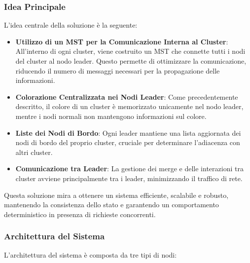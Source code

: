 \documentclass[12pt, a4paper]{report}
\begin{document}
\subsubsection{Idea Principale}

L'idea centrale della soluzione è la seguente:

\begin{itemize}
    \item \textbf{Utilizzo di un MST per la Comunicazione Interna al Cluster}: All'interno di ogni cluster, viene costruito un MST che connette tutti i nodi del cluster al nodo leader. Questo permette di ottimizzare la comunicazione, riducendo il numero di messaggi necessari per la propagazione delle informazioni.
    \item \textbf{Colorazione Centralizzata nei Nodi Leader}: Come precedentemente descritto, il colore di un cluster è memorizzato unicamente nel nodo leader, mentre i nodi normali non mantengono informazioni sul colore.
    \item \textbf{Liste dei Nodi di Bordo}: Ogni leader mantiene una lista aggiornata dei nodi di bordo del proprio cluster, cruciale per determinare l'adiacenza con altri cluster.
    \item \textbf{Comunicazione tra Leader}: La gestione dei merge e delle interazioni tra cluster avviene principalmente tra i leader, minimizzando il traffico di rete.
\end{itemize}

Questa soluzione mira a ottenere un sistema efficiente, scalabile e robusto, mantenendo la consistenza dello stato e garantendo un comportamento deterministico in presenza di richieste concorrenti.

\subsubsection{Architettura del Sistema}

L'architettura del sistema è composta da tre tipi di nodi:
\end{document}
